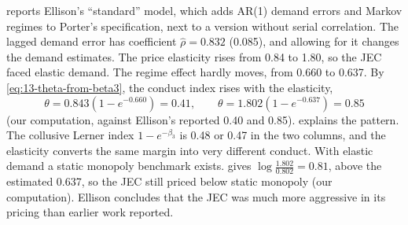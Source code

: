  reports Ellison's ``standard'' model, which adds AR(1) demand errors and Markov regimes to
Porter's specification, next to a version without serial correlation. The lagged demand error has coefficient
$\hat\rho = 0.832$ (0.085), and allowing for it changes the demand estimates. The price elasticity rises from 0.84 to
1.80, so the JEC faced elastic demand. The regime effect hardly moves, from 0.660 to 0.637. By
\eqref{eq:13-theta-from-beta3}, the conduct index rises with the elasticity,
\begin{equation*}
  \theta = 0.843\left(1 - e^{-0.660}\right) = 0.41, \qquad \theta = 1.802\left(1 - e^{-0.637}\right) = 0.85
\end{equation*}
(our computation, against Ellison's reported 0.40 and 0.85).  explains the pattern. The collusive
Lerner index $1 - e^{-\beta_3}$ is 0.48 or 0.47 in the two columns, and the elasticity converts the same margin into
very different conduct. With elastic demand a static monopoly benchmark exists.  gives
$\log\frac{1.802}{0.802} = 0.81$, above the estimated 0.637, so the JEC still priced below static monopoly (our
computation). Ellison concludes that the JEC was much more aggressive in its pricing than earlier work reported.

